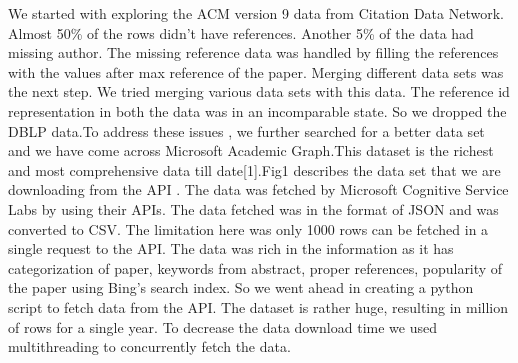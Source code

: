 \documentclass[a4paper, 11pt]{article}
\begin{document}
We started with exploring the ACM version 9 data from Citation Data Network. Almost 50\% of the rows didn't have references. Another 5\% of the data had missing author. The missing reference data was handled by filling the references with the values after max reference of the paper. Merging different data sets was the next step. We tried merging various data sets
with this data. The reference id representation in both the data was in an incomparable state. So we dropped the DBLP data.To address these issues , we further searched for a better data set and we have come across Microsoft Academic Graph.This dataset is the richest and most comprehensive data till date[1].Fig1 describes the data set that we are downloading from the API . The data was fetched by Microsoft Cognitive Service Labs by using their APIs. The data fetched was in the format of JSON and was converted to CSV.  The limitation here was only 1000 rows can be fetched in a single request to the API. The data was rich in the information as it has categorization of paper, keywords from abstract, proper references, popularity of the paper using Bing's search index. So we went ahead in creating a python script to fetch data from the API. The dataset is rather huge, resulting in million of rows for a single year. To decrease the data download time we used multithreading to concurrently fetch the data.\\
\end{document}
